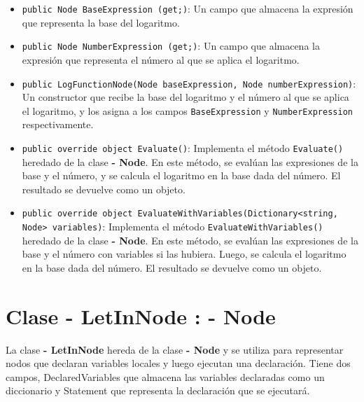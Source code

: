 \documentclass{article}
\newcommand{\subclassed}[1]{\textcolor{classcolor}{\textbf{- #1}}}
\begin{document}
\begin{itemize}
    \item \lstinline{public Node BaseExpression (get;)}: Un campo que almacena la expresión que representa la base del logaritmo.

    \item \lstinline{public Node NumberExpression (get;)}: Un campo que almacena la expresión que representa el número al que se aplica el logaritmo.

    \item \lstinline{public LogFunctionNode(Node baseExpression, Node numberExpression)}: Un constructor que recibe la base del logaritmo y el número al que se aplica el logaritmo, y los asigna a los campos \lstinline{BaseExpression} y \lstinline{NumberExpression} respectivamente.

    \item \lstinline{public override object Evaluate()}: Implementa el método \lstinline{Evaluate()} heredado de la clase \subclassed{Node}. En este método, se evalúan las expresiones de la base y el número, y se calcula el logaritmo en la base dada del número. El resultado se devuelve como un objeto.

    \item \lstinline{public override object EvaluateWithVariables(Dictionary<string, Node> variables)}: Implementa el método \lstinline{EvaluateWithVariables()} heredado de la clase \subclassed{Node}. En este método, se evalúan las expresiones de la base y el número con variables si las hubiera. Luego, se calcula el logaritmo en la base dada del número. El resultado se devuelve como un objeto.
\end{itemize}
\section{Clase \subclassed{LetInNode} : \subclassed{Node}}

La clase \subclassed{LetInNode} hereda de la clase \subclassed{Node} y se utiliza para representar nodos que declaran variables locales y luego ejecutan una declaración. Tiene dos campos, \textcolor{fieldcolor}{DeclaredVariables} que almacena las variables declaradas como un diccionario y \textcolor{fieldcolor}{Statement} que representa la declaración que se ejecutará.
\end{document}
